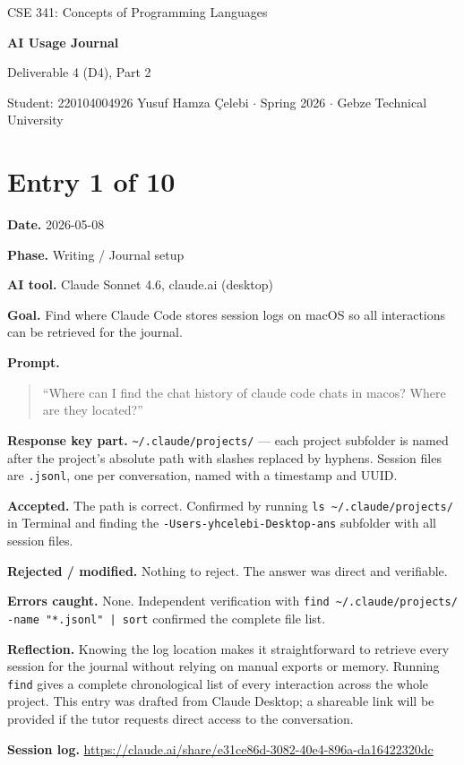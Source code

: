 \documentclass[11pt,a4paper]{article}
\newcommand{\code}[1]{\texttt{#1}}
\newcommand{\field}[2]{\textbf{#1.} #2\par}
\newcommand{\prompt}[1]{%
  \textbf{Prompt.}
  \begin{quote}\small #1\end{quote}
}
\newcommand{\sessionlog}[1]{\textbf{Session log.} \url{#1}\par}
\begin{document}
\begin{center}
  {\footnotesize\color{anscaption}CSE 341: Concepts of Programming Languages\par}
  \vspace{3pt}
  {\huge\bfseries\sffamily AI Usage Journal\par}
  \vspace{4pt}
  {\large Deliverable 4 (D4), Part 2\par}
  \vspace{6pt}
  {\footnotesize\color{anscaption}
    Student: 220104004926 Yusuf Hamza \c{C}elebi \(\cdot\)
    Spring 2026 \(\cdot\)
    Gebze Technical University\par}
\end{center}
\vspace{8pt}

\section{Entry 1 of 10}
\field{Date}{2026-05-08}
\field{Phase}{Writing / Journal setup}
\field{AI tool}{Claude Sonnet 4.6, claude.ai (desktop)}
\field{Goal}{Find where Claude Code stores session logs on macOS so all interactions can be retrieved for the journal.}
\prompt{``Where can I find the chat history of claude code chats in macos? Where are they located?''}
\field{Response key part}{\texttt{\textasciitilde/.claude/projects/} --- each project subfolder is named after the project's absolute path with slashes replaced by hyphens. Session files are \texttt{.jsonl}, one per conversation, named with a timestamp and UUID.}
\field{Accepted}{The path is correct. Confirmed by running \code{ls \textasciitilde/.claude/projects/} in Terminal and finding the \texttt{-Users-yhcelebi-Desktop-ans} subfolder with all session files.}
\field{Rejected / modified}{Nothing to reject. The answer was direct and verifiable.}
\field{Errors caught}{None. Independent verification with \code{find \textasciitilde/.claude/projects/ -name "*.jsonl" | sort} confirmed the complete file list.}
\field{Reflection}{Knowing the log location makes it straightforward to retrieve every session for the journal without relying on manual exports or memory. Running \code{find} gives a complete chronological list of every interaction across the whole project. This entry was drafted from Claude Desktop; a shareable link will be provided if the tutor requests direct access to the conversation.}
\sessionlog{https://claude.ai/share/e31ce86d-3082-40e4-896a-da16422320dc}
\end{document}
